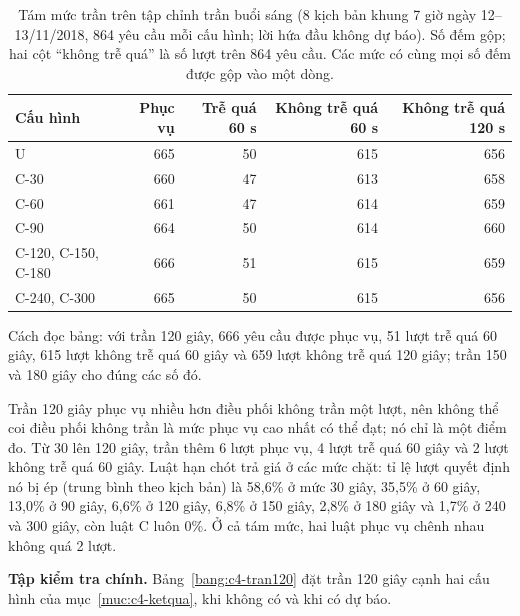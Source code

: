 \begin{table}[htbp]
\centering
\caption{Tám mức trần trên tập chỉnh trần buổi sáng (8 kịch bản khung 7 giờ ngày 12--13/11/2018, 864 yêu cầu
mỗi cấu hình; lời hứa đầu không dự báo). Số đếm gộp; hai cột ``không trễ quá'' là số lượt trên 864 yêu cầu. Các mức
có cùng mọi số đếm được gộp vào một dòng.}
\label{bang:c4-sang}
\small
\begin{tabular}{@{}lrrrr@{}}
\toprule
\textbf{Cấu hình} & \textbf{Phục vụ} & \textbf{Trễ quá 60 s} & \textbf{Không trễ quá 60 s} &
\textbf{Không trễ quá 120 s}\\
\midrule
U & 665 & 50 & 615 & 656\\
C-30 & 660 & 47 & 613 & 658\\
C-60 & 661 & 47 & 614 & 659\\
C-90 & 664 & 50 & 614 & 660\\
C-120, C-150, C-180 & 666 & 51 & 615 & 659\\
C-240, C-300 & 665 & 50 & 615 & 656\\
\bottomrule
\end{tabular}
\end{table}

Cách đọc bảng: với trần 120 giây, 666 yêu cầu được phục vụ, 51 lượt trễ quá 60 giây, 615 lượt không trễ quá 60 giây
và 659 lượt không trễ quá 120 giây; trần 150 và 180 giây cho đúng các số đó.

Trần 120 giây phục vụ nhiều hơn điều phối không trần một lượt, nên không thể coi điều phối không trần là mức phục vụ
cao nhất có thể đạt; nó chỉ là một điểm đo. Từ 30 lên 120 giây, trần thêm 6 lượt phục vụ, 4 lượt trễ quá 60 giây và 2
lượt không trễ quá 60 giây. Luật hạn chót trả giá ở các mức chặt: tỉ lệ lượt quyết định nó bị ép (trung bình theo
kịch bản) là 58,6\% ở mức 30 giây, 35,5\% ở 60 giây, 13,0\% ở 90 giây, 6,6\% ở 120 giây, 6,8\% ở 150 giây, 2,8\% ở 180
giây và 1,7\% ở 240 và 300 giây, còn luật C luôn 0\%. Ở cả tám mức, hai luật phục vụ chênh nhau không quá 2 lượt.

\textbf{Tập kiểm tra chính.} Bảng~\ref{bang:c4-tran120} đặt trần 120 giây cạnh hai cấu hình của
mục~\ref{muc:c4-ketqua}, khi không có và khi có dự báo.

